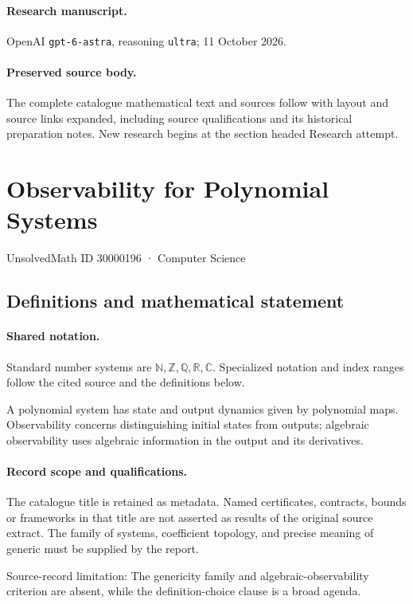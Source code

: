 \documentclass[11pt]{article}
\begin{document}
\paragraph{Research manuscript.} OpenAI \texttt{gpt-6-astra}, reasoning \texttt{ultra}; 11 October 2026.
\paragraph{Preserved source body.} The complete catalogue mathematical text and sources follow with layout and source links expanded, including source qualifications and its historical preparation notes. New research begins at the section headed Research attempt.

\section{Observability for Polynomial Systems}\label{30000196}
{\small UnsolvedMath ID 30000196 · Computer Science}
\subsection{Definitions and mathematical statement}

\paragraph{Shared notation.}Standard number systems are $\mathbb N,\mathbb Z,\mathbb Q,\mathbb R,\mathbb C$. Specialized notation and index ranges follow the cited source and the definitions below.


A polynomial system has state and output dynamics given by polynomial maps. Observability concerns distinguishing initial states from outputs; algebraic observability uses algebraic information in the output and its derivatives.
\paragraph{Record scope and qualifications.}
The catalogue title is retained as metadata. Named certificates, contracts, bounds or frameworks in that title are not asserted as results of the original source extract.
The family of systems, coefficient topology, and precise meaning of generic must be supplied by the report.

Source-record limitation: The genericity family and algebraic-observability criterion are absent, while the definition-choice clause is a broad agenda.
\end{document}

